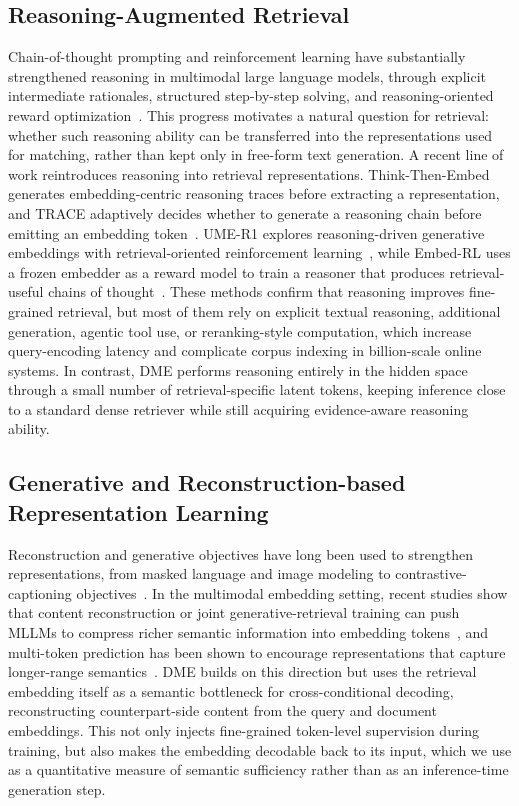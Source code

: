 \subsection{Reasoning-Augmented Retrieval}
Chain-of-thought prompting and reinforcement learning have substantially
strengthened reasoning in multimodal large language models, through explicit
intermediate rationales, structured step-by-step solving, and reasoning-oriented
reward optimization~\cite{MMCoT,LLaVaCoT,VisionR1,R1Onevision,VCSTaR}. This
progress motivates a natural question for retrieval: whether such reasoning
ability can be transferred into the representations used for matching, rather
than kept only in free-form text generation.
A recent line of work reintroduces reasoning into retrieval representations. Think-Then-Embed generates embedding-centric reasoning traces before extracting a representation, and TRACE adaptively decides whether to generate a reasoning chain before emitting an embedding token~\cite{ThinkThenEmbed,TRACE}. UME-R1 explores reasoning-driven generative embeddings with retrieval-oriented reinforcement learning~\cite{UMER1}, while Embed-RL uses a frozen embedder as a reward model to train a reasoner that produces retrieval-useful chains of thought~\cite{EmbedRL}. These methods confirm that reasoning improves fine-grained retrieval, but most of them rely on explicit textual reasoning, additional generation, agentic tool use, or reranking-style computation, which increase query-encoding latency and complicate corpus indexing in billion-scale online systems. 
In contrast, DME performs reasoning entirely in the hidden space through a small number of retrieval-specific latent tokens, keeping inference close to a standard dense retriever while still acquiring evidence-aware reasoning ability.

\subsection{Generative and Reconstruction-based Representation Learning}
Reconstruction and generative objectives have long been used to strengthen representations, from masked language and image modeling to contrastive-captioning objectives~\cite{bert,MAE,CoCa}. In the multimodal embedding setting, recent studies show that content reconstruction or joint generative-retrieval training can push MLLMs to compress richer semantic information into embedding tokens~\cite{CoCoA,CREM}, and multi-token prediction has been shown to encourage representations that capture longer-range semantics~\cite{MultiTokenPrediction,DeepSeekV3,deepseekv4}. DME builds on this direction but uses the retrieval embedding itself as a semantic bottleneck for cross-conditional decoding, reconstructing counterpart-side content from the query and document embeddings. This not only injects fine-grained token-level supervision during training, but also makes the embedding decodable back to its input, which we use as a quantitative measure of semantic sufficiency rather than as an inference-time generation step.
